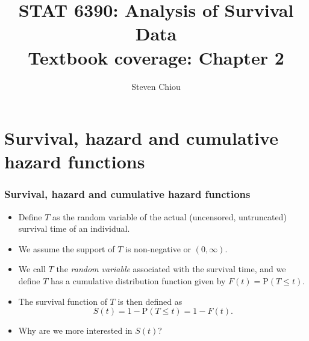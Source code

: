 \documentclass[10pt]{beamer}\usepackage[]{graphicx}\usepackage[]{color}
\title[STAT 6390]{STAT 6390: Analysis of Survival Data\\
  \small{Textbook coverage: Chapter 2}\\}
\author[Steven Chiou]{Steven Chiou}
\institute[UTD]{Department of Mathematical Sciences, \\ University of Texas at Dallas}
\date{}
\newcommand{\empr}[1]{{\emph{\color{red}#1}}}
\newcommand{\p}{\mathrm{P}}
\begin{document}
\begin{frame}[fragile]
  \titlepage

\end{frame}

\bgroup
{}

\section{Survival, hazard and cumulative hazard functions}
\begin{frame}[fragile]
  \frametitle{Survival, hazard and cumulative hazard functions}
  \begin{itemize}
  \item Define $T$ as the random variable of the actual (uncensored, untruncated) survival 
    time of an individual. 
  \item We assume the support of $T$ is non-negative or $(0, \infty)$.
  \item We call $T$ the \empr{random variable} associated with the survival time, 
    and we define $T$ has a cumulative distribution function given by
    $F(t) = \p(T \le t)$.
  \item The survival function of $T$ is then defined as $$S(t) = 1 - \p(T\le t) = 1 - F(t).$$
  \item Why are we more interested in $S(t)$?
  \end{itemize}


\end{frame}
\end{document}
